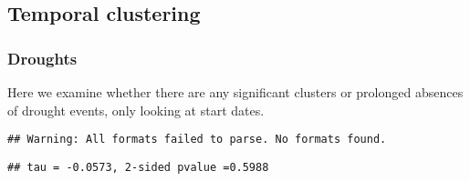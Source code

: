 \documentclass[
]{article}
\newenvironment{Shaded}{\begin{snugshade}}{\end{snugshade}}
\newcommand{\AttributeTok}[1]{\textcolor[rgb]{0.77,0.63,0.00}{#1}}
\newcommand{\FunctionTok}[1]{\textcolor[rgb]{0.00,0.00,0.00}{#1}}
\newcommand{\NormalTok}[1]{#1}
\newcommand{\OtherTok}[1]{\textcolor[rgb]{0.56,0.35,0.01}{#1}}
\newcommand{\SpecialCharTok}[1]{\textcolor[rgb]{0.00,0.00,0.00}{#1}}
\newcommand{\StringTok}[1]{\textcolor[rgb]{0.31,0.60,0.02}{#1}}
\begin{document}
\hypertarget{temporal-clustering}{%
\subsection{Temporal clustering}\label{temporal-clustering}}

\hypertarget{droughts}{%
\subsubsection{Droughts}\label{droughts}}

Here we examine whether there are any significant clusters or prolonged
absences of drought events, only looking at start dates.

\begin{Shaded}
\end{Shaded}

\begin{verbatim}
## Warning: All formats failed to parse. No formats found.
\end{verbatim}

\begin{Shaded}
\end{Shaded}

\begin{verbatim}
## tau = -0.0573, 2-sided pvalue =0.5988
\end{verbatim}

\begin{Shaded}
\end{Shaded}
\end{document}

